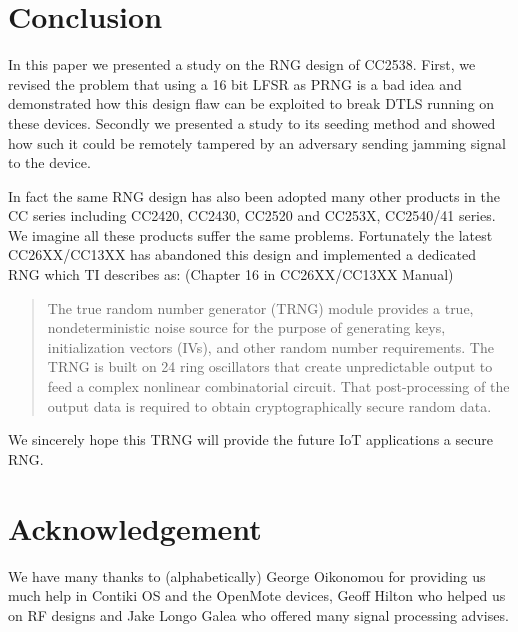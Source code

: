 \section{Conclusion}\label{Conclusion}
In this paper we presented a study on the RNG design of CC2538. First, we revised the problem that using a 16 bit LFSR as PRNG is a bad idea and demonstrated how this design flaw can be exploited to break DTLS running on these devices. Secondly we presented a study to its seeding method and showed how such it could be remotely tampered by an adversary sending jamming signal to the device.

In fact the same RNG design has also been adopted many other products in the CC series including CC2420\cite{CC2420Manual}, CC2430\cite{CC2430Manual}, CC2520\cite{CC2520Manual} and CC253X, CC2540/41 series\cite{CC2530Manual}. We imagine all these products suffer the same problems. Fortunately the latest CC26XX/CC13XX\cite{CC26XXManual} has abandoned this design and implemented a dedicated RNG which TI describes as: (Chapter 16 in CC26XX/CC13XX Manual\cite{CC26XXManual})
\begin{quote}
The true random number generator (TRNG) module provides a true, nondeterministic noise source for the
purpose of generating keys, initialization vectors (IVs), and other random number requirements. The
TRNG is built on 24 ring oscillators that create unpredictable output to feed a complex nonlinear
combinatorial circuit. That post-processing of the output data is required to obtain cryptographically secure
random data.
\end{quote}

We sincerely hope this TRNG will provide the future IoT applications a secure RNG.

\section{Acknowledgement}
We have many thanks to (alphabetically) George Oikonomou for providing us much help in Contiki OS and the OpenMote devices, Geoff Hilton who helped us on RF designs and Jake Longo Galea who offered many signal processing advises.